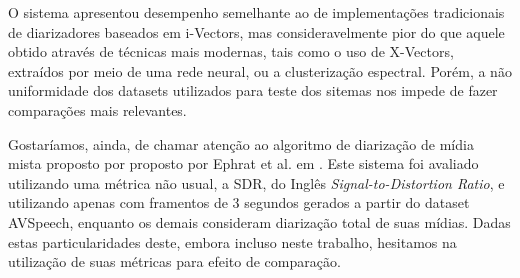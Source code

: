 O sistema apresentou desempenho semelhante ao de implementações tradicionais de diarizadores baseados em i-Vectors, mas consideravelmente pior do que aquele obtido através de técnicas mais modernas, tais como o uso de X-Vectors, extraídos por meio de uma rede neural, ou a clusterização espectral.
Porém, a não uniformidade dos datasets utilizados para teste dos sitemas nos impede de fazer comparações mais relevantes.

Gostaríamos, ainda, de chamar atenção ao algoritmo de diarização de mídia mista proposto por  proposto por Ephrat et al. em \cite{ephratLookingListenCocktail2018}.
Este sistema foi avaliado utilizando uma métrica não usual, a SDR, do Inglês \textit{Signal-to-Distortion Ratio}, e utilizando apenas com framentos de 3 segundos gerados a partir do dataset AVSpeech, enquanto os demais consideram diarização total de suas mídias.
Dadas estas particularidades deste, embora incluso neste trabalho, hesitamos na utilização de suas métricas para efeito de comparação.